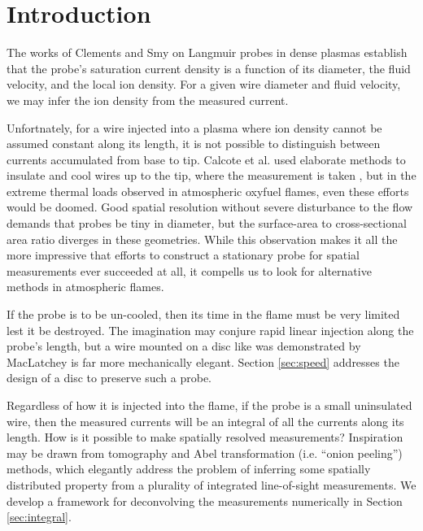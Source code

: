 \section{Introduction}\label{sec:intro}

The works of Clements and Smy on Langmuir probes in dense plasmas \cite{} establish that the probe's saturation current density is a function of its diameter, the fluid velocity, and the local ion density.  For a given wire diameter and fluid velocity, we may infer the ion density from the measured current.

Unfortnately, for a wire injected into a plasma where ion density cannot be assumed constant along its length, it is not possible to distinguish between currents accumulated from base to tip.  Calcote et al. used elaborate methods to insulate and cool wires up to the tip, where the measurement is taken \cite{}, but in the extreme thermal loads observed in atmospheric oxyfuel flames, even these efforts would be doomed.  Good spatial resolution without severe disturbance to the flow demands that probes be tiny in diameter, but the surface-area to cross-sectional area ratio diverges in these geometries.  While this observation makes it all the more impressive that efforts to construct a stationary probe for spatial measurements ever succeeded at all, it compells us to look for alternative methods in atmospheric flames.

If the probe is to be un-cooled, then its time in the flame must be very limited lest it be destroyed.  The imagination may conjure rapid linear injection along the probe's length, but a wire mounted on a disc like was demonstrated by MacLatchey \cite{} is far more mechanically elegant.  Section \ref{sec:speed} addresses the design of a disc to preserve such a probe.

Regardless of how it is injected into the flame, if the probe is a small uninsulated wire, then the measured currents will be an integral of all the currents along its length.  How is it possible to make spatially resolved measurements?  Inspiration may be drawn from tomography and Abel transformation (i.e. ``onion peeling'') methods, which elegantly address the problem of inferring some spatially distributed property from a plurality of integrated line-of-sight measurements.  We develop a framework for deconvolving the measurements numerically in Section \ref{sec:integral}.
